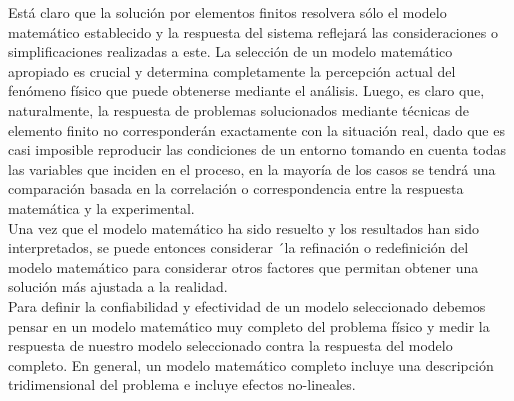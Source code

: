 Está claro que la solución por elementos finitos resolvera sólo el modelo matemático 
establecido y la respuesta del sistema reflejará las consideraciones o simplificaciones 
realizadas a este. La selección de un modelo matemático apropiado es crucial y determina 
completamente la percepción actual del fenómeno físico que puede obtenerse mediante el 
análisis. Luego, es claro que, naturalmente, la respuesta de problemas solucionados 
mediante técnicas de elemento finito no corresponderán exactamente con la situación real, 
dado que es casi imposible reproducir las condiciones de un entorno tomando en cuenta 
todas las variables que inciden en el proceso, en la mayoría de los casos se tendrá 
una comparación basada en la correlación o correspondencia entre la respuesta matemática 
y la experimental.\\

Una vez que el modelo matemático ha sido resuelto y los resultados han sido interpretados, 
se puede entonces considerar ´la refinación o redefinición del modelo matemático para 
considerar otros factores que permitan obtener una solución más ajustada a la realidad.\\

Para definir la confiabilidad y efectividad de un modelo seleccionado debemos pensar 
en un modelo matemático muy completo del problema físico y medir la respuesta de nuestro 
modelo seleccionado contra la respuesta del modelo completo. En general, un modelo matemático 
completo incluye una descripción tridimensional del problema e incluye efectos no-lineales. \\

